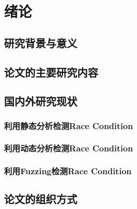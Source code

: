 \cleardoublepage

\section{绪论}

\subsection{研究背景与意义}

\subsection{论文的主要研究内容}

\subsection{国内外研究现状}

\subsubsection{利用静态分析检测Race Condition}

\subsubsection{利用动态分析检测Race Condition}

\subsubsection{利用Fuzzing检测Race Condition}

\subsection{论文的组织方式}